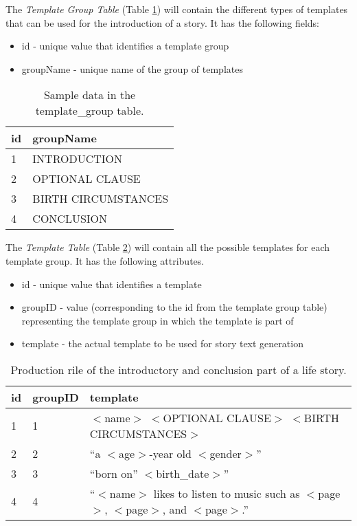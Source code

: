 The \textit{Template Group Table} (Table \ref{tab:TemplateGrp}) will contain the different types of templates that can be used for the introduction of a story. It has the following fields:
\begin{itemize}
\item id - unique value that identifies a template group
\item groupName - unique name of the group of templates
\end{itemize}

\begin{table}[ph!]   %
\centering
\caption{Sample data in the template\_group table.} \vspace{0.25em}
\begin{tabular}{|p{1cm}|p{6cm}|} \hline
\textbf{id} & \textbf{groupName} \\ \hline
1 & INTRODUCTION \\ \hline
2 & OPTIONAL CLAUSE \\ \hline
3 & BIRTH CIRCUMSTANCES \\ \hline
4 & CONCLUSION \\ \hline
\end{tabular}
\label{tab:TemplateGrp}
\end{table}

The \textit{Template Table} (Table \ref{tab:Template}) will contain all the possible templates for each template group. It has the following attributes.
\begin{itemize}
\item id - unique value that identifies a template
\item groupID - value (corresponding to the id from the template group table) representing the template group in which the template is part of
\item template - the actual template to be used for story text generation
\end{itemize}

\clearpage
\begin{table}[ph!]   %
\centering
\caption{Production rile of the introductory and conclusion part of a life story.} \vspace{0.25em}
\begin{tabular}{|p{1cm}|p{2cm}|p{7cm}|} \hline
\textbf{id} & \textbf{groupID} & \textbf{template} \\ \hline
1 & 1 & $<$name$>$ $<$OPTIONAL CLAUSE$>$ $<$BIRTH CIRCUMSTANCES$>$ \\ \hline
2 & 2 & ``a $<$age$>$-year old $<$gender$>$'' \\ \hline
3 & 3 & ``born on'' $<$birth\_date$>$'' \\ \hline
4 & 4 & ``$<$name$>$ likes to listen to music such as $<$page$>$, $<$page$>$, and $<$page$>$.'' \\ \hline
\end{tabular}
\label{tab:Template}
\end{table}


